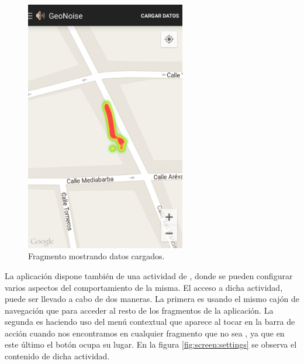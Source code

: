 \begin{figure}[H]
\begin{minipage}{0.45\textwidth}
 \includegraphics[height=11cm]{graphs/screen_heatmap.png} \caption{Fragmento  mostrando datos cargados.}\label{fig:screen:heatmap}
\end{minipage}
\end{figure}

    La aplicación dispone también de una actividad de , donde se pueden configurar varios aspectos del comportamiento de la misma. El acceso a dicha actividad, puede ser llevado a cabo de dos maneras. La primera es usando el mismo cajón de navegación que para acceder al resto de los fragmentos de la aplicación. La segunda es haciendo uso del menú contextual que aparece al tocar en la barra de acción cuando nos encontramos en cualquier fragmento que no sea , ya que en este último el botón  ocupa su lugar. En la figura \ref{fig:screen:settings} se observa el contenido de dicha actividad.
    
